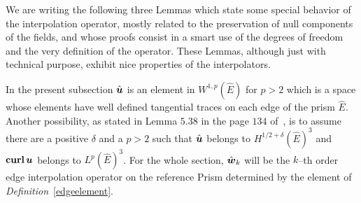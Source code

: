 We are writing the following three Lemmas which state some special
behavior of the interpolation operator, mostly related to the preservation of
null components of the fields, and whose proofs consist in a smart use of the
degrees of freedom and the very definition of the operator. These Lemmas, 
although just with technical purpose, exhibit
nice properties of the interpolators.

In the present subsection $\hat{\boldsymbol{u}}$ is an element
in $W^{1,p}(\hat{E})$ for $p>2$ which is a space whose elements have well
defined tangential traces on each edge of the prism $\hat{E}$.
Another possibility, as stated in Lemma $5.38$ in the page $134$ of~\cite{monk},
is to assume there are 
a positive $\delta$ and a $p>2$ such that 
$\hat{\boldsymbol{u}}$ belongs to $H^{1/2+\delta}(\hat{E})^3$ and
${\bf curl}\,\boldsymbol{u}$ belongs to $L^p(\hat{E})^3$.
For the whole section, $\hat{\boldsymbol{w}}_k$ will be the $k$--th order edge 
interpolation operator on the reference
Prism determined by the element of
\emph{Definition}~\ref{edgeelement}.

